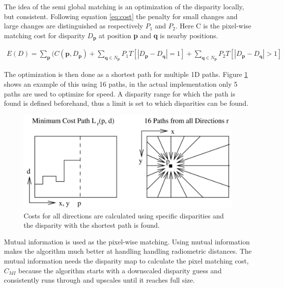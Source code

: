 The idea of the semi global matching is an optimization of the disparity locally, but consistent. Following equation \ref{eq:cost} the penalty for small changes and large changes are distinguished as respectively $P_{1}$ and $P_{2}$. Here C is the pixel-wise matching cost for disparity $D_{\textbf{p}}$ at position \textbf{p} and \textbf{q} is nearby positions.

\begin{equation}\label{eq:cost}
\begin{split}
E(D) = \sum\limits_{\textbf{p}}(C(\textbf{p},D_{\textbf{p}}) + \sum\limits_{\textbf{q} \in N_{\textbf{p}} } P_{1} T [|D_{\textbf{p}} - D_{\textbf{q}}| = 1] + \sum\limits_{\textbf{q} \in N_{\textbf{p}} } P_{2} T [|D_{\textbf{p}} - D_{\textbf{q}}| > 1]
\end{split}
\end{equation} 

The optimization is then done as a shortest path for multiple 1D paths. Figure \ref{fig:paths} shows an example of this using 16 paths, in the actual implementation only 5 paths are used to optimize for speed. A disparity range for which the path is found is defined beforehand, thus a limit is set to which disparities can be found. 

\begin{figure}[h!]
  \centering
    \includegraphics[scale=0.2]{graphics/06_vision/cost_aggregation.jpg}
      \caption{Costs for all directions are calculated using specific disparities and the disparity with the shortest path is found.}
    \label{fig:paths}
\end{figure}

Mutual information \cite{egnal2000mutual} is used as the pixel-wise matching. Using mutual information makes the algorithm much better at handling handling radiometric distances. The mutual information needs the disparity map to calculate the pixel matching cost, $ C_{MI} $ because the algorithm starts with a downscaled disparity guess and consistently runs through and upscales until it reaches full size. 

